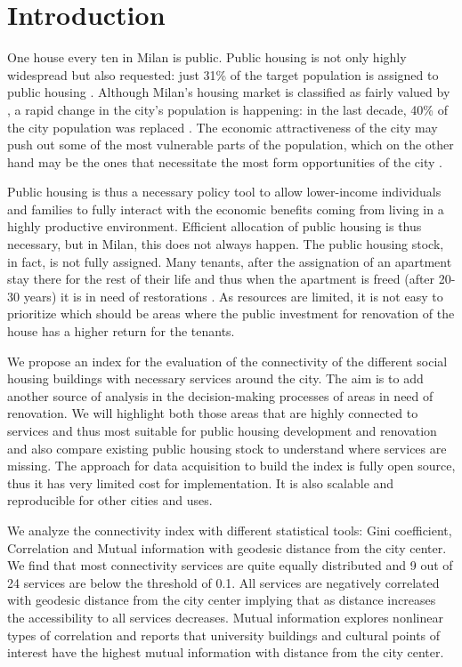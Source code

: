 \documentclass[12pt]{article}
\begin{document}
\newpage

\section{Introduction}


One house every ten in Milan is public. Public housing is not only highly widespread but also requested:  just 31\% of the target population is assigned to public housing \parencite{comune2023}. Although Milan's housing market is classified as fairly valued by \cite{ubsbubble}, a rapid change in the city's population is happening: in the last decade, 40\% of the city population was replaced \parencite{maran2023}. The economic attractiveness of the city may push out some of the most vulnerable parts of the population, which on the other hand may be the ones that necessitate the most form opportunities of the city \parencite{Chetty2017}.

Public housing is thus a necessary policy tool to allow lower-income individuals and families to fully interact with the economic benefits coming from living in a highly productive environment. Efficient allocation of public housing is thus necessary, but in Milan, this does not always happen. The public housing stock, in fact, is not fully assigned. Many tenants, after the assignation of an apartment stay there for the rest of their life and thus when the apartment is freed (after 20-30 years) it is in need of restorations \parencite{maran2023}. As resources are limited, it is not easy to prioritize which should be areas where the public investment for renovation of the house has a higher return for the tenants.

We propose an index for the evaluation of the connectivity of the different social housing buildings with necessary services around the city. The aim is to add another source of analysis in the decision-making processes of areas in need of renovation. We will highlight both those areas that are highly connected to services and thus most suitable for public housing development and renovation and also compare existing public housing stock to understand where services are missing.  The approach for data acquisition to build the index is fully open source, thus it has very limited cost for implementation. It is also scalable and reproducible for other cities and uses.

We analyze the connectivity index with different statistical tools: Gini coefficient, Correlation and Mutual information with geodesic distance from the city center. We find that most connectivity services are quite equally distributed and 9 out of 24 services are below the threshold of 0.1. All services are negatively correlated with geodesic distance from the city center implying that as distance increases the accessibility to all services decreases. Mutual information explores nonlinear types of correlation and reports that university buildings and cultural points of interest have the highest mutual information with distance from the city center.
\end{document}
